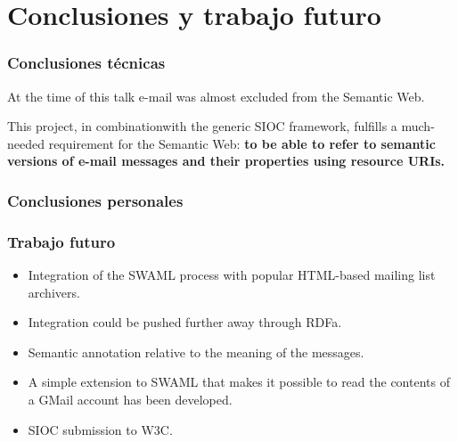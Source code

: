 \documentclass[spanish,notes=hide]{beamer}
\begin{document}
\section{Conclusiones y trabajo futuro}
\frame
{
  \frametitle{Conclusiones técnicas}

  \begin{Large}
    At the time of this talk e-mail was almost excluded from the Semantic Web.

    \vspace{1cm}

    This project, in combinationwith the generic SIOC framework, fulfills a 
    much-needed requirement for the Semantic Web: \textbf{to be able to refer 
    to semantic versions of e-mail messages and their properties using resource 
    URIs.}

  \end{Large}
}
\frame
{
  \frametitle{Conclusiones personales}

}
\frame
{
  \frametitle{Trabajo futuro}

  \begin{itemize}
   \item \begin{Large}Integration of the SWAML process with popular HTML-based mailing list archivers.\end{Large}
   \item \begin{Large}Integration could be pushed further away through RDFa.\end{Large}
   \item \begin{Large}Semantic annotation relative to the meaning of the messages.\end{Large}
   \item \begin{Large}A simple extension to SWAML that makes it possible to read the contents of a GMail account has 
		been developed.\end{Large}
   \item \begin{Large}SIOC submission to W3C.\end{Large}
  \end{itemize}
}

%
\end{document}
